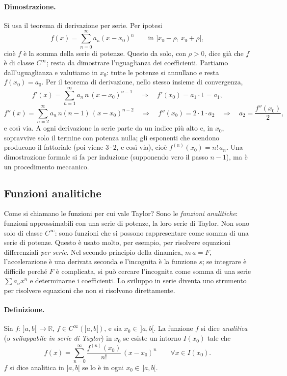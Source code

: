 \paragraph{Dimostrazione.}
Si usa il teorema di derivazione per serie. Per ipotesi
\[
  f(x) = \sum_{n=0}^{\infty} a_n (x-x_0)^n \qquad \text{in } ]x_0-\rho,\,x_0+\rho[ ,
\]
cioè $f$ è la somma della serie di potenze.
Questo da solo, con $\rho>0$, dice già che $f$ è di classe $C^\infty$; resta da dimostrare l'uguaglianza dei
coefficienti.
Partiamo dall'uguaglianza e valutiamo in $x_0$: tutte le potenze si annullano e resta $f(x_0)=a_0$.
Per il teorema di derivazione, nello stesso insieme di convergenza,
\[
  f'(x) = \sum_{n=1}^{\infty} a_n\, n\, (x-x_0)^{n-1}
  \quad\Longrightarrow\quad f'(x_0) = a_1\cdot 1 = a_1 ,
\]
\[
  f''(x) = \sum_{n=2}^{\infty} a_n\, n(n-1)\, (x-x_0)^{n-2}
  \quad\Longrightarrow\quad f''(x_0) = 2\cdot 1\cdot a_2
  \quad\Longrightarrow\quad a_2 = \frac{f''(x_0)}{2} ,
\]
e così via.
A ogni derivazione la serie parte da un indice più alto e, in $x_0$, sopravvive solo il termine con potenza
nulla; gli esponenti che scendono producono il fattoriale (poi viene $3\cdot2$, e così via), cioè
$f^{(n)}(x_0) = n!\,a_n$. Una dimostrazione formale si fa per induzione (supponendo vero il passo $n-1$), ma è
un procedimento meccanico.

\subsection{Funzioni analitiche}

Come si chiamano le funzioni per cui vale Taylor? Sono le \emph{funzioni analitiche}: funzioni approssimabili con
una serie di potenze, la loro serie di Taylor.
Non sono solo di classe $C^\infty$: sono funzioni che si possono rappresentare come somma di una serie di
potenze. Questo è usato molto, per esempio, per risolvere equazioni differenziali \emph{per serie}.
Nel secondo principio della dinamica, $m\,a = F$, l'accelerazione è una derivata seconda e l'incognita è la
funzione $s$; se integrare è difficile perché $F$ è complicata, si può cercare l'incognita come somma di una
serie $\sum a_n x^n$ e determinarne i coefficienti. Lo sviluppo in serie diventa uno strumento per risolvere
equazioni che non si risolvono direttamente.

\paragraph{Definizione.}
Sia $f\colon\,]a,b[\,\to\mathbb{R}$, $f\in C^\infty(]a,b[)$, e sia $x_0\in\,]a,b[$. La funzione $f$ si dice
\emph{analitica} (o \emph{sviluppabile in serie di Taylor}) in $x_0$ se esiste un intorno $I(x_0)$ tale che
\[
  f(x) = \sum_{n=0}^{\infty} \frac{f^{(n)}(x_0)}{n!}\,(x-x_0)^n \qquad \forall x\in I(x_0) .
\]
$f$ si dice analitica in $]a,b[$ se lo è in ogni $x_0\in\,]a,b[$.

